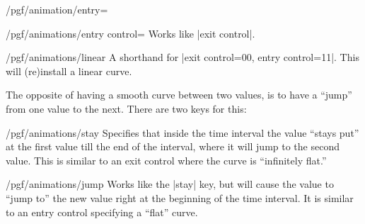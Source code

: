 \begin{key}{/pgf/animation/entry=}
  \begin{key}{/pgf/animations/entry control=}
    Works like |exit control|.
  \end{key}

  \begin{key}{/pgf/animations/linear}
    A shorthand for |exit control={0}{0}, entry control={1}{1}|. This
    will (re)install a linear curve.
  \end{key}

  The opposite of having a smooth curve between two values, is to have
  a ``jump'' from one value to the next. There are two keys for this:


  \begin{key}{/pgf/animations/stay}
    Specifies that inside the time interval the value ``stays put'' at
    the first value till the end of the interval, where it will jump
    to the second value. This is similar to an exit control where the
    curve is ``infinitely flat.''
    
\begin{codeexample}[width=2.3cm]
\end{codeexample}
  \end{key}
  
  \begin{key}{/pgf/animations/jump}
    Works like the |stay| key, but will cause the value to ``jump to''
    the new value right at the beginning of the time interval. It is
    similar to an entry control specifying a ``flat'' curve.

\begin{codeexample}[width=2.3cm]
\end{codeexample}
  \end{key}



\end{key}
